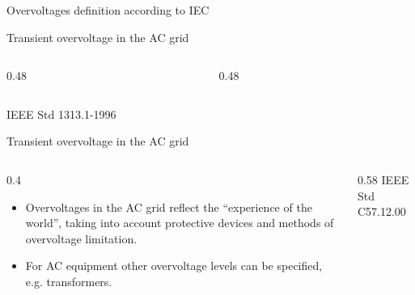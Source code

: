 
\begin{frame}{Overvoltages definition according to IEC}
  \centering
\end{frame}

\begin{frame}{Transient overvoltage in the AC grid}
  \begin{columns}[c,onlytextwidth]
    \begin{column}{0.48\textwidth}
      \centering
    \end{column}
    \begin{column}{0.48\textwidth}
      \centering
    \end{column}
  \end{columns}
  \vspace{0.4em}
  {\centering\color{atGray}\footnotesize IEEE Std 1313.1-1996\par}
\end{frame}

\begin{frame}{Transient overvoltage in the AC grid}
  \begin{columns}[c,onlytextwidth]
    \begin{column}{0.4\textwidth}
      \begin{itemize}
        \setlength{\itemsep}{0.5em}
        \item Overvoltages in the AC grid reflect the ``experience of the
              world'', taking into account protective devices and methods of
              overvoltage limitation.
        \item For AC equipment other overvoltage levels can be specified,
              e.g. transformers.
      \end{itemize}
      \vspace{0.3em}

    \end{column}
    \begin{column}{0.58\textwidth}
      \centering
      {\color{atGray}\footnotesize IEEE Std C57.12.00}      
    \end{column}
  \end{columns}
\end{frame}

